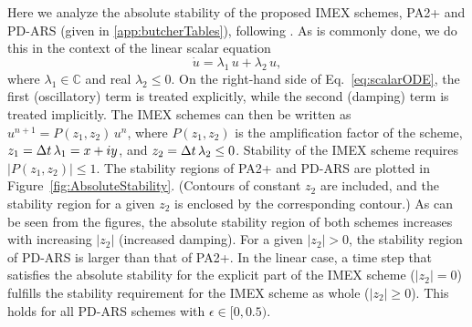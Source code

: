 Here we analyze the absolute stability of the proposed IMEX schemes, PA2+ and PD-ARS (given in \ref{app:butcherTables}), following \cite{hu_etal_2018}.  
As is commonly done, we do this in the context of the linear scalar equation
\begin{equation}
  \dot{u}=\lambda_{1}\,u+\lambda_{2}\,u,
  \label{eq:scalarODE}
\end{equation}
where $\lambda_{1}\in\mathbb{C}$ and real $\lambda_{2}\le0$.  
On the right-hand side of Eq.~\eqref{eq:scalarODE}, the first (oscillatory) term is treated explicitly, while the second (damping) term is treated implicitly.  
The IMEX schemes can then be written as $u^{n+1} =P(z_{1},z_{2})\,u^{n}$, where $P(z_{1},z_{2})$ is the amplification factor of the scheme, $z_{1}=\Delta t\,\lambda_{1} = x +iy$, and $z_{2} = \Delta t\,\lambda_{2} \le 0$.  
Stability of the IMEX scheme requires $|P(z_1,z_2)|\leq 1$.  
The stability regions of PA2+ and PD-ARS are plotted in Figure~\ref{fig:AbsoluteStability}.  
(Contours of constant $z_{2}$ are included, and the stability region for a given $z_{2}$ is enclosed by the corresponding contour.)  
As can be seen from the figures, the absolute stability region of both schemes increases with increasing $|z_{2}|$ (increased damping).  
For a given $|z_{2}|>0$, the stability region of PD-ARS is larger than that of PA2+.  
In the linear case, a time step that satisfies the absolute stability for the explicit part of the IMEX scheme ($|z_2| = 0$) fulfills the stability requirement for the IMEX scheme as whole ($|z_2| \geq 0$).  
This holds for all PD-ARS schemes with $\epsilon\in [0,0.5)$.
